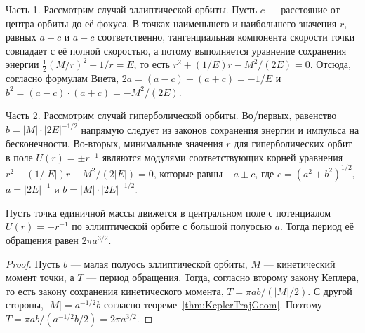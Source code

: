\documentclass[
	extrafontsizes,
	11pt,
	hyphens,
]{memoir}
\begin{document}
\begin{proofparts}

\item[Часть 1.]
Рассмотрим случай эллиптической орбиты.
Пусть \(c\) --- расстояние от центра орбиты до её фокуса.
В точках наименьшего и наибольшего значения \(r\), равных \(a - c\) и \(a + c\) соответственно, тангенциальная компонента скорости точки совпадает с её полной скоростью, а потому выполняется уравнение сохранения энергии
\(\frac{1}{2} (M / r)^2 - 1 / r = E\),
то есть
\(r^2 + (1/E)r - M^2/(2E) = 0\).
Отсюда, согласно формулам Виета,
\(2a = (a - c) + (a + c) = - 1/E\)
и
\(b^2 = (a - c) \cdot (a + c) = - M^2 / (2E)\).

\item[Часть 2.]
Рассмотрим случай гиперболической орбиты.
Во\-/первых, равенство \(b = \lvert M \rvert \cdot \lvert 2 E \rvert^{-1/2}\) напрямую следует из законов сохранения энергии и импульса на бесконечности.
Во-вторых, минимальные значения \(r\) для гиперболических орбит в поле \(U(r) = \pm r^{-1}\) являются модулями соответствующих корней уравнения
\(r^2 + (1 / \lvert E \rvert)r - M^2/(2 \lvert E \rvert) = 0\),
которые равны \(-a \pm c\), где \(c = (a^2 + b^2)^{1/2}\),
\(a = \lvert 2 E \rvert^{-1}\) и \(b = \lvert M \rvert \cdot \lvert 2 E \rvert^{-1/2}\).
\qedhere

\end{proofparts}

\begin{corollary}
Пусть точка единичной массы движется в центральном поле с потенциалом \(U(r) = - r^{-1}\) по эллиптической орбите с большой полуосью \(a\).
Тогда период её обращения равен \(2 \pi a^{3/2}\).
\end{corollary}

\begin{proof}
Пусть \(b\) --- малая полуось эллиптической орбиты, \(M\) --- кинетический момент точки, а \(T\) --- период обращения.
Тогда, согласно второму закону Кеплера, то есть закону сохранения кинетического момента, \(T = \pi a b / (\lvert M \rvert / 2)\).
С другой стороны, \(\lvert M \rvert = a^{-1/2} b\) согласно теореме~\ref{thm:KeplerTrajGeom}.
Поэтому \(T = \pi a b / (a^{-1/2} b / 2) = 2 \pi a^{3/2}\).
\end{proof}
\end{document}
